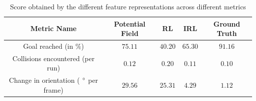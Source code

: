 

\begin{table}[htbp]
	\begin{center}
		\renewcommand{\arraystretch}{1.3}
		\begin{tabular}{|c|c|c|c|c|}
			\hline
			\textbf{Metric Name} & \textbf{Potential Field} & \textbf{RL} & \textbf{IRL}  &  \textbf{Ground Truth} \\
			\hline
			Goal reached (in $\%$) & $75.11$ & $40.20$ & $65.30$ & $91.16$\\
			Collisions encountered (per run) & $ 0.12$ & $0.20$ & $0.11$ & $0.10$\\
			Change in orientation ( $\degree$ per frame) & $29.56$ & $25.31$ &  $4.29$ & $1.12$ \\
			\hline
		\end{tabular}
	\end{center}
	\caption{Score obtained by the different feature representations across different metrics}
	\label{tab:inter_method_numerical_results}
\end{table}
